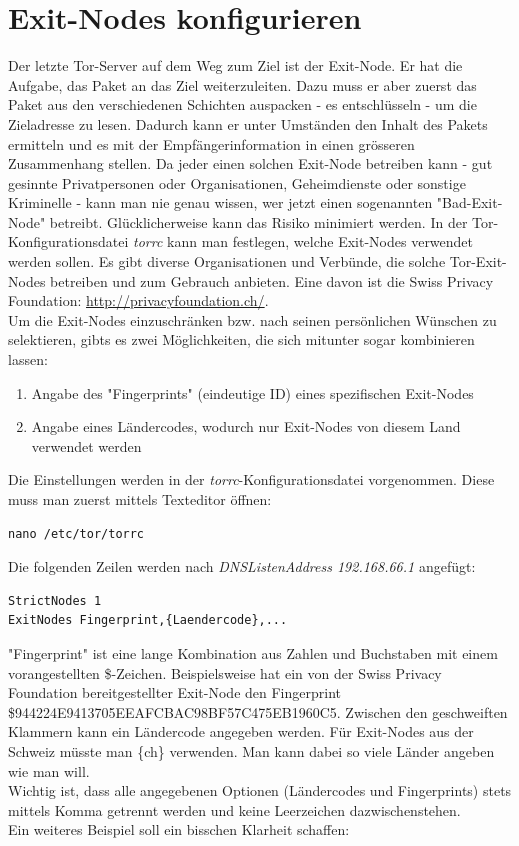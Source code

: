\section{Exit-Nodes konfigurieren}
Der letzte Tor-Server auf dem Weg zum Ziel ist der Exit-Node. Er hat die Aufgabe, das Paket an das Ziel weiterzuleiten. Dazu muss er aber zuerst das Paket aus den verschiedenen Schichten auspacken - es entschlüsseln - um die Zieladresse zu lesen. Dadurch kann er unter Umständen den Inhalt des Pakets ermitteln und es mit der Empfängerinformation in einen grösseren Zusammenhang stellen. Da jeder einen solchen Exit-Node betreiben kann - gut gesinnte Privatpersonen oder Organisationen, Geheimdienste oder sonstige Kriminelle - kann man nie genau wissen, wer jetzt einen sogenannten "Bad-Exit-Node" betreibt. Glücklicherweise kann das Risiko minimiert werden. In der Tor-Konfigurationsdatei \textit{torrc} kann man festlegen, welche Exit-Nodes verwendet werden sollen. Es gibt diverse Organisationen und Verbünde, die solche Tor-Exit-Nodes betreiben und zum Gebrauch anbieten. Eine davon ist die Swiss Privacy Foundation: \url{http://privacyfoundation.ch/}.
\\
Um die Exit-Nodes einzuschränken bzw. nach seinen persönlichen Wünschen zu selektieren, gibts es zwei Möglichkeiten, die sich mitunter sogar kombinieren lassen: 

\begin{enumerate}
\item Angabe des "Fingerprints" (eindeutige ID) eines spezifischen Exit-Nodes
\item Angabe eines Ländercodes, wodurch nur Exit-Nodes von diesem Land verwendet werden
\end{enumerate}

Die Einstellungen werden in der \textit{torrc}-Konfigurationsdatei vorgenommen. Diese  muss man zuerst mittels Texteditor öffnen:

\begin{lstlisting}
nano /etc/tor/torrc
\end{lstlisting}

Die folgenden Zeilen werden nach \textit{DNSListenAddress 192.168.66.1} angefügt:

\begin{lstlisting}
StrictNodes 1
ExitNodes Fingerprint,{Laendercode},...
\end{lstlisting}

"Fingerprint" ist eine lange Kombination aus Zahlen und Buchstaben mit einem vorangestellten \$-Zeichen. Beispielsweise hat ein von der Swiss Privacy Foundation bereitgestellter Exit-Node den Fingerprint \$944224E9413705EEAFCBAC98BF57C475EB1960C5.
Zwischen den geschweiften Klammern kann ein Ländercode angegeben werden. Für Exit-Nodes aus der Schweiz müsste man \{ch\} verwenden. Man kann dabei so viele Länder angeben wie man will. 
\\
Wichtig ist, dass alle angegebenen Optionen (Ländercodes und Fingerprints) stets mittels Komma getrennt werden und keine Leerzeichen dazwischenstehen.
\\
Ein weiteres Beispiel soll ein bisschen Klarheit schaffen:

